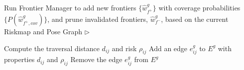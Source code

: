 \documentclass[letterpaper]{article} %
\begin{document}
\begin{algorithm}[t!]
{\begin{algorithmic}
  \STATE Run Frontier Manager to add new frontiers $\{\hat{w}^g_{f^+}\}$ with coverage probabilities $\{P(\hat{w}^g_{f^+,cov})\}$, and prune invalidated frontiers, $\hat{w}^g_{f^-}$, based on the current Riskmap and Pose Graph
  \STATE \hspace{4.5cm} $\triangleright$ \cite{keidar2012robot}

  
  
  
 

      \STATE Compute the traversal distance $d_{ij}$ and risk $\rho_{ij}$
        \STATE Add an edge $e^g_{ij}$ to $E^g$ with properties $d_{ij}$ and $\rho_{ij}$
      \ELSE
        \STATE Remove the edge $e^g_{ij}$ from $E^g$
      \ENDIF
    \ENDFOR
  \ENDFOR



\end{algorithmic}}
\end{algorithm}
\end{document}
